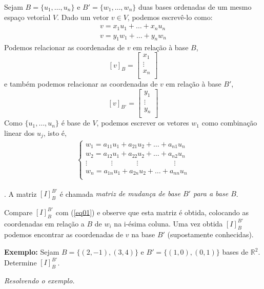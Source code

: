 \documentclass[oneside,a4paper,12pt]{article}
\begin{document}
Sejam $B = \{ u_1, \dots, u_n \}$ e $B' = \{ w_1, \dots, w_n \}$ duas bases ordenadas de um mesmo espaço vetorial $V$. Dado um vetor $v \in V$, podemos escrevê-lo como:
\begin{eqnarray}
v = x_1 u_1 + \dots + x_n u_n \\
v = y_1 w_1 + \dots + y_n w_n
\end{eqnarray}
Podemos relacionar as coordenadas de $v$ em relação à base $B$,
$$[v]_B = \left[
\begin{array}{c}
x_1	\\
\vdots	\\
x_n \\
\end{array}
\right]$$
e também podemos relacionar as coordenadas de $v$ em relação à base $B'$,
$$[v]_{B'} = \left[
\begin{array}{c}
y_1	\\
\vdots	\\
y_n \\
\end{array}
\right]$$
Como $\{ u_1, \dots, u_n\}$ é base de $V$, podemos escrever os vetores $w_1$ como combinação linear dos $u_j$, isto é,
\begin{eqnarray}
\label{eq01}
\begin{cases}
w_1 = a_{11}u_1 + a_{21}u_2 + \dots + a_{n1}u_n \\
w_2 = a_{12}u_1 + a_{22}u_2 + \dots + a_{n2}u_n \\
\vdots \hspace{40pt} \vdots \hspace{40pt} \vdots \hspace{60pt} \vdots \\
w_n = a_{1n}u_1 + a_{2n}u_2 + \dots + a_{nn}u_n \\
\end{cases}
\end{eqnarray}

\newpage
.
\newpage
A matriz $[I]_{B}^{B'}$ é chamada \emph{matriz de mudança de base $B'$ para a base $B$}.

Compare $[I]_{B}^{B'}$ com (\ref{eq01}) e observe que esta matriz é obtida, colocando as coordenadas em relação a $B$ de $w_i$ na i-ésima coluna. Uma vez obtida $[I]_{B}^{B'}$ podemos encontrar as coordenadas de $v$ na base $B'$ (supostamente conhecidas).

{\bf Exemplo:} Sejam $B = \{ (2,-1), (3,4) \}$ e $B' = \{ (1,0), (0,1) \}$ bases de $\mathbb{R}^2$. Determine $[I]_{B}^{B'}$.

\vspace{50pt}
\emph{Resolvendo o exemplo.}
\end{document}
